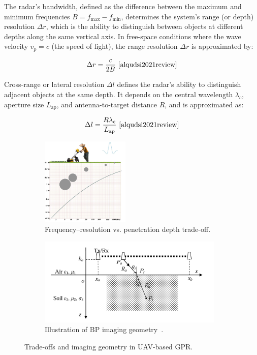 The radar’s bandwidth, defined as the difference between the maximum and minimum frequencies $B = f_{\text{max}} - f_{\text{min}}$, determines the system’s range (or depth) resolution $\Delta r$, which is the ability to distinguish between objects at different depths along the same vertical axis. In free-space conditions where the wave velocity $v_p = c$ (the speed of light), the range resolution $\Delta r$ is approximated by:

\[
\Delta r = \frac{c}{2B}~\cite{alqudsi2021review}
\]

Cross-range or lateral resolution $\Delta l$ defines the radar’s ability to distinguish adjacent objects at the same depth. It depends on the central wavelength $\lambda_c$, aperture size $L_{\text{ap}}$, and antenna-to-target distance $R$, and is approximated as:

\[
\Delta l = \frac{R \lambda_c}{L_{\text{ap}}}~\cite{alqudsi2021review}
\]

\begin{figure}[h!]
    \centering
    \begin{subfigure}[t]{0.48\linewidth}
        \centering
        \includegraphics[height=4.2cm]{figs/Huirui/freq_tradeoff.png}
        \caption{Frequency–resolution vs. penetration depth trade-off\protect\footnotemark.}
        \label{fig:freq_tradeoff}
    \end{subfigure}
    \hfill
    \begin{subfigure}[t]{0.48\linewidth}
        \centering
        \includegraphics[height=4.2cm]{figs/Huirui/bp_geometry.png}
        \caption{Illustration of BP imaging geometry~\cite{lei2014multi}.}
        \label{fig:bp_geometry}
    \end{subfigure}
    \caption{Trade-offs and imaging geometry in UAV-based GPR.}
\end{figure}

